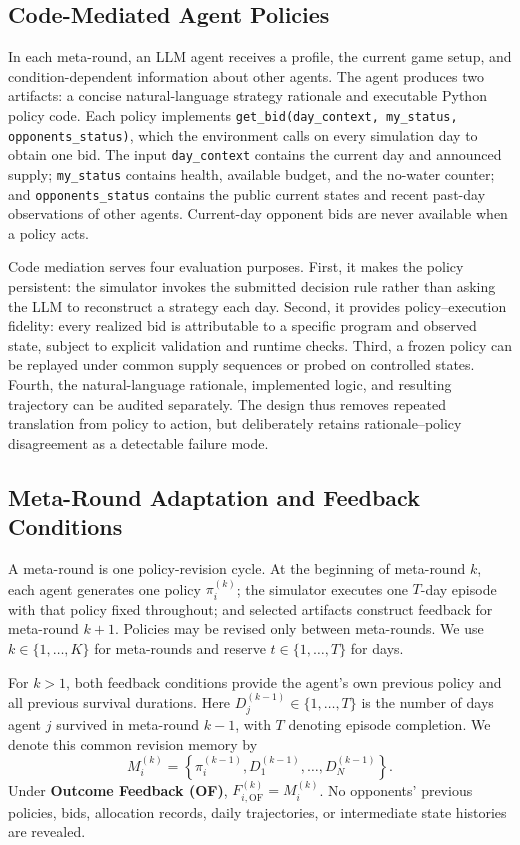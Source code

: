 \documentclass[letterpaper]{article} %
\begin{document}
\subsection{Code-Mediated Agent Policies}

In each meta-round, an LLM agent receives a profile, the current game setup,
and condition-dependent information about other agents. The agent produces
two artifacts: a concise natural-language strategy rationale and executable
Python policy code. Each policy implements
\texttt{get\_bid(day\_context, my\_status, opponents\_status)}, which the
environment calls on every simulation day to obtain one bid. The input
\texttt{day\_context} contains the current day and
announced supply; \texttt{my\_status} contains health, available budget, and
the no-water counter; and \texttt{opponents\_status} contains the public
current states and recent past-day observations of other agents. Current-day
opponent bids are never available when a policy acts.

Code mediation serves four evaluation purposes. First, it makes the policy
persistent: the simulator invokes the submitted decision rule rather than
asking the LLM to reconstruct a strategy each day. Second, it provides
policy--execution fidelity: every realized bid is attributable to a specific
program and observed state, subject to explicit validation and runtime checks.
Third, a frozen policy can be replayed under common supply sequences or probed
on controlled states. Fourth, the natural-language rationale, implemented
logic, and resulting trajectory can be audited separately. The design thus
removes repeated translation from policy to action, but deliberately retains
rationale--policy disagreement as a detectable failure mode.

\subsection{Meta-Round Adaptation and Feedback Conditions}
A meta-round is one policy-revision cycle. At the
beginning of meta-round $k$, each agent generates one policy
$\pi_i^{(k)}$; the simulator executes one $T$-day episode with
that policy fixed throughout; and selected artifacts construct
feedback for meta-round $k+1$. Policies may be revised only
between meta-rounds. We use $k\in\{1,\ldots,K\}$ for
meta-rounds and reserve $t\in\{1,\ldots,T\}$ for days.

For $k>1$, both feedback conditions provide the agent's own
previous policy and all previous survival durations. Here
$D_j^{(k-1)}\in\{1,\ldots,T\}$ is the number of days agent $j$
survived in meta-round $k-1$, with $T$ denoting episode
completion. We denote this common revision memory by
\begin{equation}
    M_i^{(k)}
    =
    \left\{\pi_i^{(k-1)},
    D_1^{(k-1)},\ldots,D_N^{(k-1)}\right\}.
\end{equation}
Under \textbf{Outcome Feedback (OF)}, $F_{i,\mathrm{OF}}^{(k)}=M_i^{(k)}$.
No opponents' previous policies, bids, allocation records, daily
trajectories, or intermediate state histories are revealed.
\end{document}
